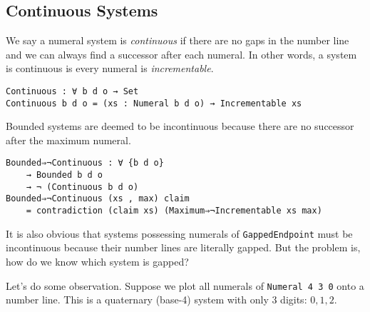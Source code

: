 \documentclass[\main/thesis.tex]{subfiles}
\begin{document}
\subsection{Continuous Systems}\label{continuous}

We say a numeral system is \textit{continuous} if there are no gaps in the number
line and we can always find a successor after each numeral.
In other words, a system is continuous is every numeral is \textit{incrementable}.

\begin{lstlisting}
Continuous : ∀ b d o → Set
Continuous b d o = (xs : Numeral b d o) → Incrementable xs
\end{lstlisting}

Bounded systems are deemed to be incontinuous because there are no successor
after the maximum numeral.

\begin{lstlisting}
Bounded⇒¬Continuous : ∀ {b d o}
    → Bounded b d o
    → ¬ (Continuous b d o)
Bounded⇒¬Continuous (xs , max) claim
    = contradiction (claim xs) (Maximum⇒¬Incrementable xs max)
\end{lstlisting}

It is also obvious that systems possessing numerals of \lstinline|GappedEndpoint|
must be incontinuous because their number lines are literally gapped.
But the problem is, how do we know which system is gapped?

Let's do some observation.
Suppose we plot all numerals of \lstinline|Numeral 4 3 0| onto a number line.
This is a quaternary (base-4) system with only 3 digits: $0, 1, 2$.
\end{document}
